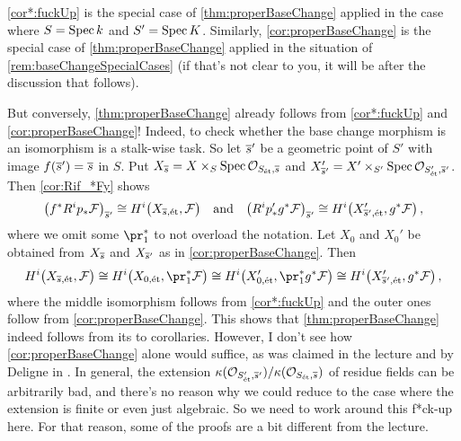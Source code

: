 \documentclass[a4paper, 10pt, oneside, DIV=9, chapterprefix=true, numbers=enddot, bibliography=totoc]{scrbook}
\begin{document}
\begin{rem}\label{rem:fuckUp}
\cref{cor*:fuckUp} is the special case of \cref{thm:properBaseChange} applied in the case where $S=\operatorname{Spec} k$ and $S'=\operatorname{Spec} K$. Similarly,
\cref{cor:properBaseChange} is the special case of \cref{thm:properBaseChange} applied in the situation of \cref{rem:baseChangeSpecialCases} (if that's not clear to you, it will be after the discussion that follows).

But conversely, \cref{thm:properBaseChange} already follows from \cref{cor*:fuckUp} and \cref{cor:properBaseChange}! Indeed, to check whether the base change morphism is an isomorphism is a stalk-wise task. So let $\ov{s}'$ be a geometric point of $S'$ with image $f(\ov{s}')=\ov{s}$ in $S$. Put $X_{\ov{s}}=X\times_S\Spec \Oo_{S_\et,\ov{s}}$ and $X'_{\ov{s}'}=X'\times_{S'}\Spec \Oo_{S'_\et,\ov{s}'}$. Then \cref{cor:Rif_*Fy} shows
\begin{equation*}
	\big(f^*R^i p_*\Ff\big)_{\ov{s}'}\cong H^i\big(X_{\ov
	s,\et},\Ff\big)\quad\text{and}\quad \big(R^i p'_*g^*\Ff\big)_{\ov s'}\cong H^i\big(X'_{\ov{s}',\et},g^*\Ff\big)\,,
\end{equation*}
where we omit some $\pr_1^*$ to not overload the notation. Let $X_0$ and $X_0'$ be obtained from $X_{\ov{s}}$ and $X_{\ov{s}'}$ as in \cref{cor:properBaseChange}. Then
\begin{equation*}
	H^i\big(X_{\ov s,\et},\Ff\big)\cong H^i\big(X_{0,\et},\pr_1^*\Ff\big)\cong H^i\big(X'_{0,\et},\pr_1^*g^*\Ff\big)\cong H^i\big(X'_{\ov s',\et},g^*\Ff\big)\,,
\end{equation*}
where the middle isomorphism follows from \cref{cor*:fuckUp} and the outer ones follow from \cref{cor:properBaseChange}. This shows that \cref{thm:properBaseChange} indeed follows from its to corollaries. However, I don't see how \cref{cor:properBaseChange} alone would suffice, as was claimed in the lecture and by Deligne in \cite[Arcata~IV]{sga4.5}. In general, the extension $\kappa(\Oo_{S'_\et,\ov{s}'})/\kappa(\Oo_{S_\et,\ov{s}})$ of residue fields can be arbitrarily bad, and there's no reason why we could reduce to the case where the extension is finite or even just algebraic. So we need to work around this f*ck-up here. For that reason, some of the proofs are a bit different from the lecture.


\end{rem}
\end{document}
